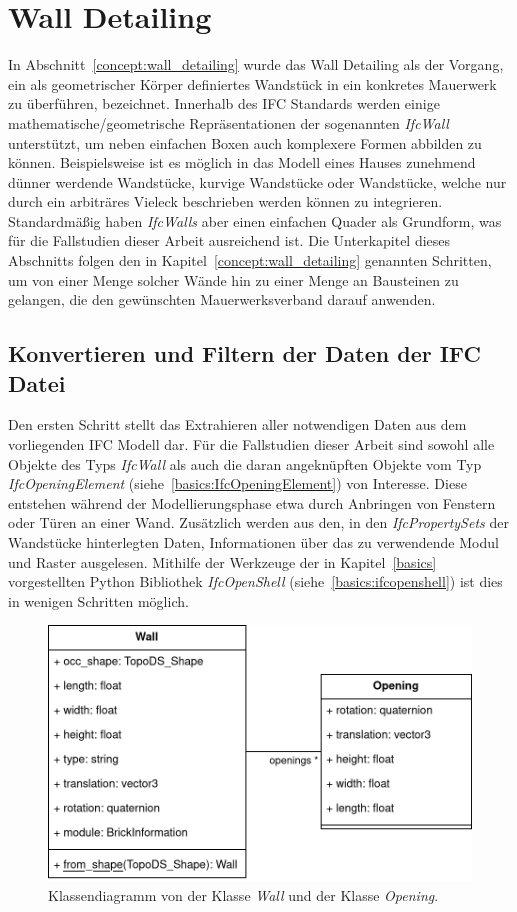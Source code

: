 \section{Wall Detailing}
In Abschnitt~\ref{concept:wall_detailing} wurde das Wall Detailing als der Vorgang, ein als geometrischer Körper definiertes Wandstück in ein konkretes Mauerwerk zu überführen, bezeichnet.
Innerhalb des IFC Standards werden einige mathematische/geometrische Repräsentationen der sogenannten \textit{IfcWall} unterstützt, um neben einfachen Boxen auch komplexere Formen abbilden zu können.
Beispielsweise ist es möglich in das Modell eines Hauses zunehmend dünner werdende Wandstücke, kurvige Wandstücke oder Wandstücke, welche nur durch ein arbiträres Vieleck beschrieben werden können zu integrieren.
Standardmäßig haben \textit{IfcWalls} aber einen einfachen Quader als Grundform, was für die Fallstudien dieser Arbeit ausreichend ist.
Die Unterkapitel dieses Abschnitts folgen den in Kapitel~\ref{concept:wall_detailing} genannten Schritten, um von einer Menge solcher Wände hin zu einer Menge an Bausteinen zu gelangen, die den gewünschten Mauerwerksverband darauf anwenden.

\subsection{Konvertieren und Filtern der Daten der IFC Datei}
Den ersten Schritt stellt das Extrahieren aller notwendigen Daten aus dem vorliegenden IFC Modell dar.
Für die Fallstudien dieser Arbeit sind sowohl alle Objekte des Typs \textit{IfcWall} als auch die daran angeknüpften Objekte vom Typ \textit{IfcOpeningElement} (siehe~\ref{basics:IfcOpeningElement}) von Interesse.
Diese entstehen während der Modellierungsphase etwa durch Anbringen von Fenstern oder Türen an einer Wand.
Zusätzlich werden aus den, in den \textit{IfcPropertySets} der Wandstücke hinterlegten Daten, Informationen über das zu verwendende Modul und Raster ausgelesen.
Mithilfe der Werkzeuge der in Kapitel~\ref{basics} vorgestellten Python Bibliothek \textit{IfcOpenShell} (siehe~\ref{basics:ifcopenshell}) ist dies in wenigen Schritten möglich.
\begin{figure}[htb]
  \centering
  \includegraphics[width=0.8\columnwidth]{fig/klassendiagramm_ifc_to_wall.drawio.png}
  \caption{Klassendiagramm von der Klasse \textit{Wall} und der Klasse \textit{Opening}.}\label{fig:real:ifc_to_wall}
\end{figure}

